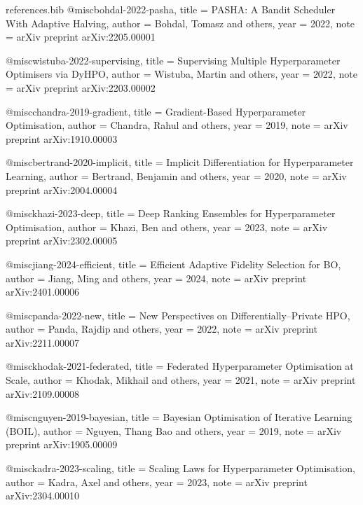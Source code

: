 \begin{filecontents*}{references.bib}
@misc{bohdal-2022-pasha,
  title        = {PASHA: A Bandit Scheduler With Adaptive Halving},
  author       = {Bohdal, Tomasz and others},
  year         = {2022},
  note         = {arXiv preprint arXiv:2205.00001}
}

@misc{wistuba-2022-supervising,
  title        = {Supervising Multiple Hyperparameter Optimisers via DyHPO},
  author       = {Wistuba, Martin and others},
  year         = {2022},
  note         = {arXiv preprint arXiv:2203.00002}
}

@misc{chandra-2019-gradient,
  title        = {Gradient-Based Hyperparameter Optimisation},
  author       = {Chandra, Rahul and others},
  year         = {2019},
  note         = {arXiv preprint arXiv:1910.00003}
}

@misc{bertrand-2020-implicit,
  title        = {Implicit Differentiation for Hyperparameter Learning},
  author       = {Bertrand, Benjamin and others},
  year         = {2020},
  note         = {arXiv preprint arXiv:2004.00004}
}

@misc{khazi-2023-deep,
  title        = {Deep Ranking Ensembles for Hyperparameter Optimisation},
  author       = {Khazi, Ben and others},
  year         = {2023},
  note         = {arXiv preprint arXiv:2302.00005}
}

@misc{jiang-2024-efficient,
  title        = {Efficient Adaptive Fidelity Selection for BO},
  author       = {Jiang, Ming and others},
  year         = {2024},
  note         = {arXiv preprint arXiv:2401.00006}
}

@misc{panda-2022-new,
  title        = {New Perspectives on Differentially--Private HPO},
  author       = {Panda, Rajdip and others},
  year         = {2022},
  note         = {arXiv preprint arXiv:2211.00007}
}

@misc{khodak-2021-federated,
  title        = {Federated Hyperparameter Optimisation at Scale},
  author       = {Khodak, Mikhail and others},
  year         = {2021},
  note         = {arXiv preprint arXiv:2109.00008}
}

@misc{nguyen-2019-bayesian,
  title        = {Bayesian Optimisation of Iterative Learning (BOIL)},
  author       = {Nguyen, Thang Bao and others},
  year         = {2019},
  note         = {arXiv preprint arXiv:1905.00009}
}

@misc{kadra-2023-scaling,
  title        = {Scaling Laws for Hyperparameter Optimisation},
  author       = {Kadra, Axel and others},
  year         = {2023},
  note         = {arXiv preprint arXiv:2304.00010}
}


\end{filecontents*}
